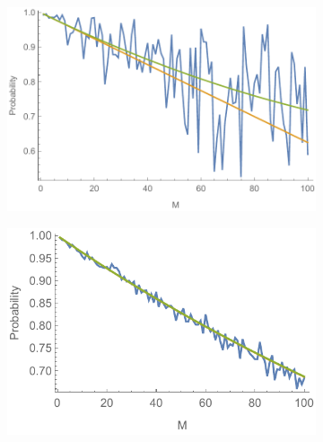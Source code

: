 \documentclass[aps,pra,twocolumn,superscriptaddress,numerical,floatfix]{revtex4-1}
\begin{document}
\begin{figure}
	\centering
	
	\begin{subfigure}[b]{.45\columnwidth}
		\includegraphics[width=\columnwidth]{Psuccess_a.pdf}
		\caption{}\label{fig:phase psuccess a}
	\end{subfigure}
	\begin{subfigure}[b]{.45\columnwidth}
		\includegraphics[width=\columnwidth]{Psuccess_b.pdf}
		\caption{}\label{fig:phase psuccess b}
	\end{subfigure}


\end{figure}
\end{document}
